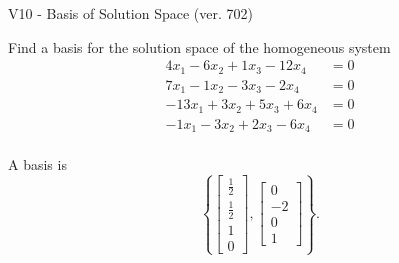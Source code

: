 \begin{exercise}
  \begin{exerciseTitle}V10 - Basis of Solution Space (ver. 702)\end{exerciseTitle}
  \begin{exerciseStatement}
    Find a basis for the solution space of the homogeneous system 
\begin{align*}
 4 x_ 1 -6 x_ 2 + 1 x_ 3 -12 x_ 4 &= 0  \\ 
  7 x_ 1 -1 x_ 2 -3 x_ 3 -2 x_ 4 &= 0  \\ 
  -13 x_ 1 + 3 x_ 2 + 5 x_ 3 + 6 x_ 4 &= 0  \\ 
  -1 x_ 1 -3 x_ 2 + 2 x_ 3 -6 x_ 4 &= 0  \\ 
 \end{align*}


 
  \end{exerciseStatement}

  \begin{exerciseAnswer}
   A basis is   
\[\left\{\left[\begin{array}{c}
\frac{1}{2} \\
\frac{1}{2} \\
1 \\
0
\end{array}\right] , \left[\begin{array}{c}
0 \\
-2 \\
0 \\
1
\end{array}\right]\right\}.\]

  


  \end{exerciseAnswer}
\end{exercise}